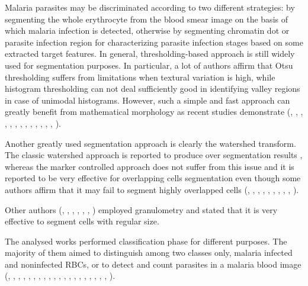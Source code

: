 \documentclass[sensors,review,submit,moreauthors,pdftex,10pt,a4paper]{mdpi}
\begin{document}
Malaria parasites may be discriminated according to two different strategies: by segmenting the whole erythrocyte from the blood smear image on the basis of which malaria infection is detected, otherwise by segmenting chromatin dot or parasite infection region for characterizing parasite infection stages based on some extracted target features.
In general, thresholding-based approach is still widely used for segmentation purposes. In particular, a lot of authors affirm that Otsu thresholding suffers from limitations when textural variation is high, while histogram thresholding can not deal sufficiently good in identifying valley regions in case of unimodal histograms. However, such a simple and fast approach can greatly benefit from mathematical morphology as recent studies demonstrate (\cite{Ahirwar2012}, \cite{Anggraini2011}, \cite{Arco2014}, \cite{DiRuberto2002}, \cite{Elter2011}, \cite{Ghosh2011},  \cite{Kareem2011}, \cite{Mushabe2013},  \cite{Rosado2017}, \cite{Ross2006}, \cite{Savkare2011b}, \cite{Savkare2015}, \cite{Somasekar2017}, \cite{Tek2010}).

Another greatly used segmentation approach is clearly the watershed transform. The classic watershed approach is reported to produce over segmentation results \cite{Savkare2011b}, whereas the marker controlled approach does not suffer from this issue and it is reported to be very effective for overlapping cells segmentation even though some authors affirm that it may fail to segment highly overlapped cells  (\cite{Das2011}, \cite{Das2013}, \cite{Das2014}, \cite{Das2015}, \cite{Devi2017}, \cite{Khan2011}, \cite{Romero2016}, \cite{Savkare2015}, \cite{Savkare2011a}, \cite{Springl2009}).

Other authors (\cite{Ahirwar2012}, \cite{DiRuberto2002}, \cite{Khan2011}, \cite{Mushabe2013}, \cite{Ross2006}, \cite{Soni2011}, \cite{Tek2010}) employed granulometry and stated that it is very effective to segment cells with regular size.

The analysed works performed classification phase for different purposes. The majority of them aimed to distinguish among two classes only, malaria infected and noninfected RBCs, or to detect and count parasites in a malaria blood image (\cite{Anggraini2011}, \cite{Arco2014}, \cite{Das2011}, \cite{Dave2017}, \cite{Das2015}, \cite{DiRuberto2002}, \cite{Elter2011}, \cite{Ghosh2011}, \cite{Kareem2012}, \cite{Khan2014}, \cite{Malihi2013}, \cite{Mushabe2013}, \cite{Oliveira2017}, \cite{Savkare2011b}, \cite{Savkare2011a}, \cite{Somasekar2011}, \cite{Somasekar2015}, \cite{Somasekar2017}, \cite{Soni2011}, \cite{Sulist2015}, \cite{Tek2006}).
\end{document}
